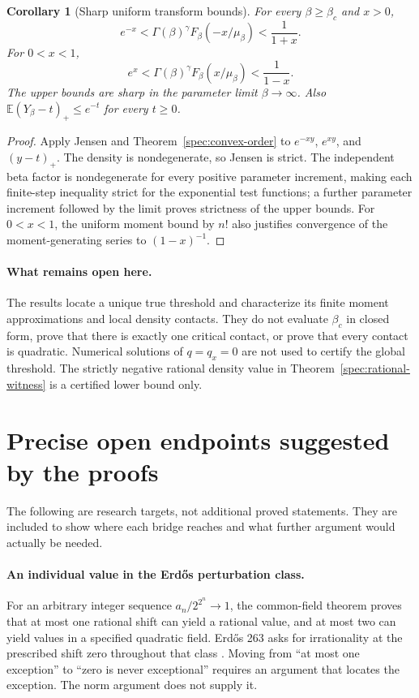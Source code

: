 \documentclass[11pt,a4paper]{article}
\newtheorem{corollary}[theorem]{Corollary}
\theoremstyle{definition}
\theoremstyle{remark}
\numberwithin{equation}{section}
\begin{document}
\begin{corollary}[Sharp uniform transform bounds]\label{spec:transform-bounds}
For every \(\beta\ge\beta_c\) and \(x>0\),
\[
 e^{-x}<\Gamma(\beta)^\gamma
             F_\beta(-x/\mu_\beta)<\frac1{1+x}.
\]
For \(0<x<1\),
\[
 e^x<\Gamma(\beta)^\gamma
             F_\beta(x/\mu_\beta)<\frac1{1-x}.
\]
The upper bounds are sharp in the parameter limit \(\beta\to\infty\).
Also \(\mathbb E(Y_\beta-t)_+\le e^{-t}\) for every \(t\ge0\).
\end{corollary}

\begin{proof}
Apply Jensen and Theorem~\ref{spec:convex-order} to \(e^{-xy}\),
\(e^{xy}\), and \((y-t)_+\).  The density is nondegenerate, so Jensen
is strict.  The independent beta factor is nondegenerate for every
positive parameter increment, making each finite-step inequality
strict for the exponential test functions; a further parameter
increment followed by the limit proves strictness of the upper bounds.
For \(0<x<1\), the uniform moment bound by \(n!\) also justifies
convergence of the moment-generating series to \((1-x)^{-1}\).
\end{proof}

\paragraph{What remains open here.}
The results locate a unique true threshold and characterize its finite
moment approximations and local density contacts.  They do not evaluate
\(\beta_c\) in closed form, prove that there is exactly one critical
contact, or prove that every contact is quadratic.  Numerical solutions
of \(q=q_x=0\) are not used to certify the global threshold.  The
strictly negative rational density value in
Theorem~\ref{spec:rational-witness} is a certified lower bound only.

\section{Precise open endpoints suggested by the proofs}
\label{sec:frontiers}

The following are research targets, not additional proved statements.
They are included to show where each bridge reaches and what further
argument would actually be needed.

\paragraph{An individual value in the Erd\H{o}s perturbation class.}
For an arbitrary integer sequence $a_n/2^{2^n}\to1$, the common-field
theorem proves that at most one rational shift can yield a rational
value, and at most two can yield values in a specified quadratic
field. Erd\H{o}s 263 asks for irrationality at the prescribed shift
zero throughout that class \cite{Erdos263}. Moving from ``at most
one exception'' to ``zero is never exceptional'' requires an argument
that locates the exception. The norm argument does not supply it.
\end{document}
